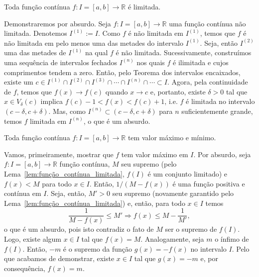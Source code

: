 \begin{lem}\label{lem:função_contínua_limitada}
  Toda função contínua $f:I=[a, b]\to \mathbb{R}$ é limitada.
\end{lem}
\begin{dem}
  Demonstraremos por absurdo. Seja $f:I=[a, b]\to\mathbb{R}$ uma função contínua não limitada. Denotemos $I^{(1)} := I$. Como $f$ é não limitada em $I^{(1)}$, temos que $f$ é não limitada em pelo menos uma das metades do intervalo $I^{(1)}$. Seja, então $I^{(2)}$ uma das metades de $I^{(1)}$ na qual $f$ é não limitada. Sucessivamente, construímos uma sequência de intervalos fechados $I^{(n)}$ nos quais $f$ é ilimitada e cujos comprimentos tendem a zero. Então, pelo Teorema dos intervalos encaixados, existe um $c\in I^{(1)}\cap I^{(2)}\cap I^{(3)}\cap \cdots \cap I^{(n)}\cap \cdots \subset I$. Agora, pela continuidade de $f$, temos que $f(x)\to f(c)$ quando $x\to c$ e, portanto, existe $\delta>0$ tal que $x\in V_\delta(c)$ implica $f(c)-1 < f(x) < f(c)+1$, i.e. $f$ é limitada no intervalo $(c-\delta, c+\delta)$. Mas, como $I^{(n)}\subset (c-\delta, c+\delta)$ para $n$ suficientemente grande, temos $f$ limitada em $I^{(n)}$, o que é um absurdo.
\end{dem}

\begin{teo}\label{teo:função_contínua_valores_extremos}
  Toda função contínua $f:I=[a, b]\to\mathbb{R}$ tem valor máximo e mínimo.
\end{teo}
\begin{dem}
  Vamos, primeiramente, mostrar que $f$ tem valor máximo em $I$. Por absurdo, seja $f:I=[a, b]\to\mathbb{R}$ função contínua, $M$ seu supremo (pelo Lema~\ref{lem:função_contínua_limitada}, $f(I)$ é um conjunto limitado) e $f(x)<M$ para todo $x\in I$. Então, $1/(M-f(x))$ é uma função positiva e contínua em $I$. Seja, então, $M'>0$ seu supremo (novamente garantido pelo Lema~\ref{lem:função_contínua_limitada}) e, então, para todo $x\in I$ temos
  \begin{equation}
    \frac{1}{M-f(x)}\leq M' \Rightarrow f(x) \leq M - \frac{1}{M'},
  \end{equation}
o que é um absurdo, pois isto contradiz o fato de $M$ ser o supremo de $f(I)$. Logo, existe algum $x\in I$ tal que $f(x)=M$. Analogamente, seja $m$ o ínfimo de $f(I)$. Então, $-m$ é o supremo da função $g(x) = -f(x)$ no intervalo $I$. Pelo que acabamos de demonstrar, existe $x\in I$ tal que $g(x)=-m$ e, por consequência, $f(x) = m$.
\end{dem}

